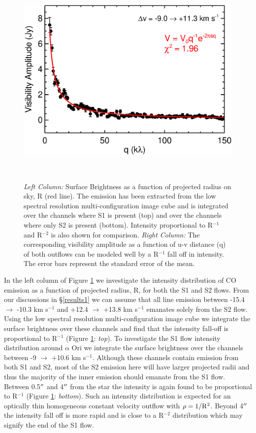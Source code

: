 \documentclass[iop]{emulateapj}
\begin{document}
\begin{figure}[hbt!]
{          \includegraphics[scale=0.50]{f17.eps}

          }
\\
\caption{\textit{Left Column:} Surface Brightness as a function of projected radius on sky, R (red line). The emission has been extracted from the low spectral resolution multi-configuration image cube and is integrated over the channels where S1 is present (top) and over the channels where only S2 is present (bottom). Intensity proportional to R${}^{-1}$ and R${}^{-2}$ is also shown for comparison. \textit{Right Column:} The corresponding visibility amplitude as a function of u-v distance (q) of both outflows can be modeled well by a R${}^{-1}$ fall off in intensity. The error bars represent the standard error of the mean.}
\label{fig:fig6}
\end{figure}

In the left column of Figure \ref{fig:fig6} we investigate the intensity distribution of CO emission as a function of projected radius, R, for both the S1 and S2 flows. From our discussions in \S \ref{results1} we can assume that all line emission between -15.4 $\rightarrow$ -10.3 km s${}^{-1}$ and +12.4 $\rightarrow$ +13.8 km s${}^{-1}$ emanates solely from the S2 flow. Using the low spectral resolution multi-configuration image cube we integrate the surface brightness over these channels and find that the intensity fall-off is proportional to R${}^{-1}$ (Figure \ref{fig:fig6}: \textit{top}). To investigate the S1 flow intensity distribution around $\alpha$ Ori we integrate the surface brightness over the channels between -9 $\rightarrow$ +10.6 km s${}^{-1}$. Although these channels contain emission from both S1 and S2, most of the S2 emission here will have larger projected radii and thus the majority of the inner emission should emanate from the S1 flow.  Between 0.5$\mbox{$^{\prime\prime}$}$ and 4$\mbox{$^{\prime\prime}$}$ from the star the intensity is again found to be proportional to R${}^{-1}$ (Figure \ref{fig:fig6}: \textit{bottom}). Such an intensity distribution is expected for an optically thin homogeneous constant velocity outflow with $\rho = 1/\rm{R^{2}}$. Beyond 4$\mbox{$^{\prime\prime}$}$ the intensity fall off is more rapid and is close to a R${}^{-2}$ distribution which may signify the end of the S1 flow.
\end{document}
